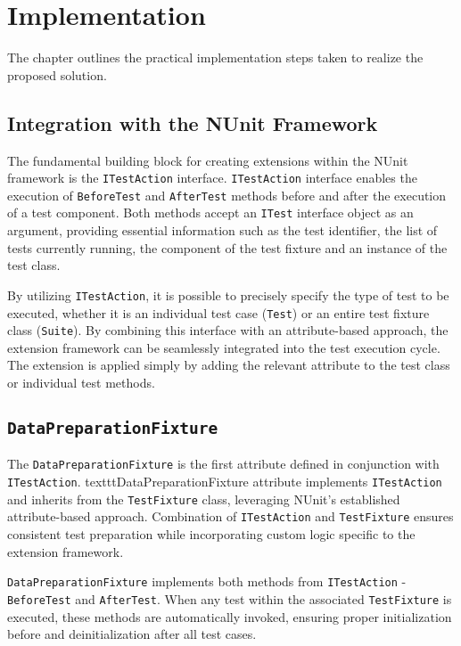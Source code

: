 
\chapter{ Implementation\label{chap:framework_implementation}}
The chapter outlines the practical implementation steps taken to realize the proposed solution.

\section{Integration with the NUnit Framework}\label{sec:TestFixtureIntegration}

The fundamental building block for creating extensions within the NUnit framework is the \texttt{ITestAction} interface. \texttt{ITestAction} interface enables the execution of \texttt{BeforeTest} and \texttt{AfterTest} methods before and after the execution of a test component. Both methods accept an \texttt{ITest} interface object as an argument, providing essential information such as the test identifier, the list of tests currently running, the component of the test fixture and an instance of the test class.

By utilizing \texttt{ITestAction}, it is possible to precisely specify the type of test to be executed, whether it is an individual test case (\texttt{Test}) or an entire test fixture class (\texttt{Suite}). By combining this interface with an attribute-based approach, the extension framework can be seamlessly integrated into the test execution cycle. The extension is applied simply by adding the relevant attribute to the test class or individual test methods.

\section{\texttt{DataPreparationFixture}}

The \texttt{DataPreparationFixture} is the first attribute defined in conjunction with \texttt{ITestAction}. texttt{DataPreparationFixture} attribute  implements \texttt{ITestAction} and inherits from the \texttt{TestFixture} class, leveraging NUnit’s established attribute-based approach. Combination of \texttt{ITestAction} and \texttt{TestFixture} ensures consistent test preparation while incorporating custom logic specific to the extension framework.

\texttt{DataPreparationFixture} implements both methods from \texttt{ITestAction} - \texttt{BeforeTest} and \texttt{AfterTest}. When any test within the associated \texttt{TestFixture} is executed, these methods are automatically invoked, ensuring proper initialization before and deinitialization after all test cases. 

